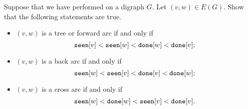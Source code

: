 \begin{Boxample}[3]
Suppose that we have performed  on a digraph $G$. Let $(v, w)\in
E(G)$. Show that the following statements are true.
\begin{itemize}
\item
$(v, w)$ is a tree or forward arc if and only if  
$$\seen[v] < \seen[w] < \done[w] < \done[v];$$
\item
$(v, w)$ is a back arc if and only if
$$\seen[w] <  \seen[v] < \done[v] < \done[w];$$ 
\item
$(v, w)$ is a cross arc if and only if 
$$\seen[w] < \done[w]  < \seen[v] < \done[v].$$
\end{itemize}
\end{Boxample}



